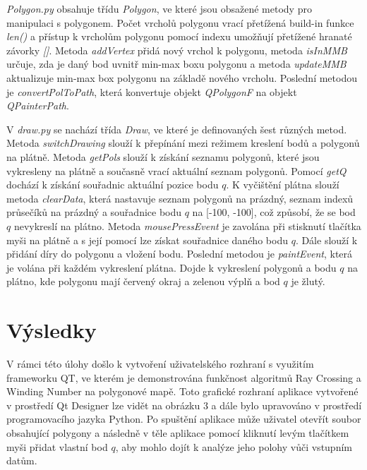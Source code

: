 \documentclass{article}
\begin{document}
\begin{spacing}{1.5}
\textit{Polygon.py} obsahuje třídu \textit{Polygon}, ve které jsou obsažené metody pro manipulaci s polygonem. Počet vrcholů polygonu vrací přetížená build-in funkce \textit{len()} a přístup k vrcholům polygonu pomocí indexu umožňují přetížené hranaté závorky \textit{[]}. Metoda \textit{addVertex} přidá nový vrchol k polygonu, metoda \textit{isInMMB} určuje, zda je daný bod uvnitř min-max boxu polygonu a metoda \textit{updateMMB} aktualizuje min-max box polygonu na základě nového vrcholu. Poslední metodou je \textit{convertPolToPath}, která konvertuje objekt \textit{QPolygonF} na objekt \textit{QPainterPath}. 

V \textit{draw.py} se nachází třída \textit{Draw}, ve které je definovaných šest různých metod. Metoda \textit{switchDrawing} slouží k přepínání mezi režimem kreslení bodů a polygonů na plátně. Metoda \textit{getPols} slouží k získání seznamu polygonů, které jsou vykresleny na plátně a současně vrací aktuální seznam polygonů. Pomocí \textit{getQ} dochází k získání souřadnic aktuální pozice bodu $q$. K vyčištění plátna slouží metoda \textit{clearData}, která nastavuje seznam polygonů na prázdný, seznam indexů průsečíků na prázdný a souřadnice bodu $q$ na [-100, -100], což způsobí, že se bod $q$ nevykreslí na plátno. Metoda \textit{mousePressEvent} je zavolána při stisknutí tlačítka myši na plátně a s její pomocí lze získat souřadnice daného bodu $q$. Dále slouží k přidání díry do polygonu a vložení bodu. Poslední metodou je \textit{paintEvent}, která je volána při každém vykreslení plátna. Dojde k vykreslení polygonů a bodu $q$ na plátno, kde polygonu mají červený okraj a zelenou výplň a bod $q$ je žlutý. 

\section{Výsledky}
V rámci této úlohy došlo k vytvoření uživatelského rozhraní s využitím frameworku QT, ve kterém je demonstrována funkčnost algoritmů Ray Crossing a Winding Number na polygonové mapě. Toto grafické rozhraní aplikace vytvořené v prostředí Qt Designer lze vidět na obrázku 3 a dále bylo upravováno v prostředí programovacího jazyka Python. Po spuštění aplikace může uživatel otevřít soubor obsahující polygony a následně v těle aplikace pomocí kliknutí levým tlačítkem myši přidat vlastní bod $q$, aby mohlo dojít k analýze jeho polohy vůči vstupním datům.


\end{spacing}
\end{document}
